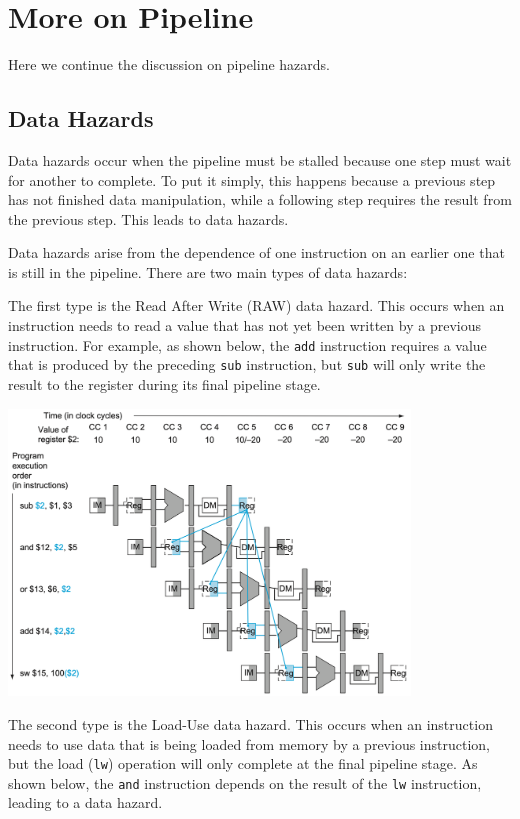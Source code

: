 \chapter{More on Pipeline}

Here we continue the discussion on pipeline hazards. 

\section{Data Hazards}
Data hazards occur when the pipeline must be stalled because one step must wait for another to complete. To put it simply, this happens because a previous step has not finished data manipulation, while a following step requires the result from the previous step. This leads to data hazards.

Data hazards arise from the dependence of one instruction on an earlier one that is still in the pipeline. There are two main types of data hazards:

The first type is the Read After Write (RAW) data hazard. This occurs when an instruction needs to read a value that has not yet been written by a previous instruction. For example, as shown below, the \verb|add| instruction requires a value that is produced by the preceding \verb|sub| instruction, but \verb|sub| will only write the result to the register during its final pipeline stage.

\begin{center}
  \includegraphics[width=0.8\textwidth]{Figure/pipeline_raw.png}
\end{center}

The second type is the Load-Use data hazard. This occurs when an instruction needs to use data that is being loaded from memory by a previous instruction, but the load (\verb|lw|) operation will only complete at the final pipeline stage. As shown below, the \verb|and| instruction depends on the result of the \verb|lw| instruction, leading to a data hazard.

